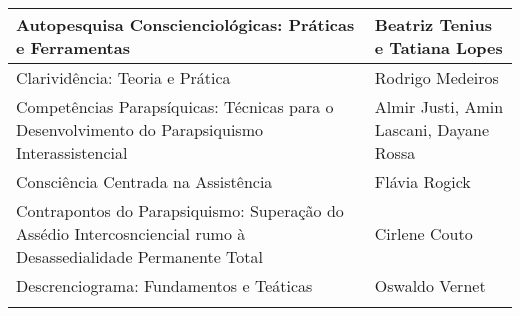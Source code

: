 \documentclass{gescons}
\begin{document}
\begin{longtable}[]{@{}
  >{\raggedright\arraybackslash}p{}
  >{\raggedright\arraybackslash}p{}@{}}
\hline
\begin{minipage}[b]{\linewidth}\raggedright
Autopesquisa Conscienciológicas: Práticas e Ferramentas
\end{minipage} & \begin{minipage}[b]{\linewidth}\raggedright
Beatriz Tenius e Tatiana Lopes
\end{minipage} \\
\hline
\begin{minipage}[b]{\linewidth}\raggedright
Clarividência: Teoria e Prática
\end{minipage} & \begin{minipage}[b]{\linewidth}\raggedright
Rodrigo Medeiros
\end{minipage} \\
\hline
\begin{minipage}[b]{\linewidth}\raggedright\addlinespace[2pt]
Competências Parapsíquicas: Técnicas para o Desenvolvimento do Parapsiquismo Interassistencial
\end{minipage} & \begin{minipage}[b]{\linewidth}\raggedright
Almir Justi, Amin Lascani, Dayane Rossa
\end{minipage} \\
\hline
\begin{minipage}[b]{\linewidth}\raggedright
Consciência Centrada na Assistência
\end{minipage} & \begin{minipage}[b]{\linewidth}\raggedright
Flávia Rogick
\end{minipage} \\
\hline
\begin{minipage}[b]{\linewidth}\raggedright\addlinespace[2pt]
Contrapontos do Parapsiquismo: Superação do Assédio Intercosnciencial rumo à Desassedialidade Permanente Total
\end{minipage} & \begin{minipage}[b]{\linewidth}\raggedright
Cirlene Couto
\end{minipage} \\
\hline
\begin{minipage}[b]{\linewidth}\raggedright
Descrenciograma: Fundamentos e Teáticas
\end{minipage} & \begin{minipage}[b]{\linewidth}\raggedright
Oswaldo Vernet
\end{minipage} \\
\hline
\begin{minipage}[b]{\linewidth}\raggedright

\end{minipage}
\end{longtable}
\end{document}
